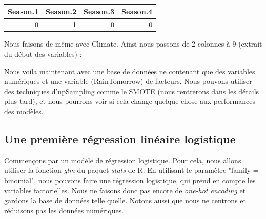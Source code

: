 \documentclass{article}
\begin{document}
\begin{table}[H]
    \centering
    \begin{tabular}{|rrrr|}
        \hline
        Season.1 & Season.2 & Season.3 & Season.4 \\
        \hline 
        0 & 1 & 0 & 0 \\
        \hline
    \end{tabular}
\end{table}

Nous faisons de même avec Climate. Ainsi nous passons de 2 colonnes à 9 (extrait du début des variables) : 

\begin{table}[ht]
    \centering
\end{table}

Nous voila maintenant avec une base de données ne contenant que des variables numériques et une variable (RainTomorrow) de facteurs. Nous pouvons utiliser des techniques d'upSampling comme le SMOTE (nous rentrerons dans les détails plus tard), et nous pourrons voir si cela change quelque chose aux performances des modèles.

\subsection{Une première régression linéaire logistique}

Commençons par un modèle de régression logistique. Pour cela, nous allons utiliser la fonction \emph{glm} du paquet \emph{stats} de R. En utilisant le paramètre "family = binomial", nous pouvons faire une régression logistique, qui prend en compte les variables factorielles. Nous ne faisons donc pas encore de \emph{one-hot encoding} et gardons la base de données telle quelle. Notons aussi que nous ne centrons et réduisons pas les données numériques.
\end{document}
